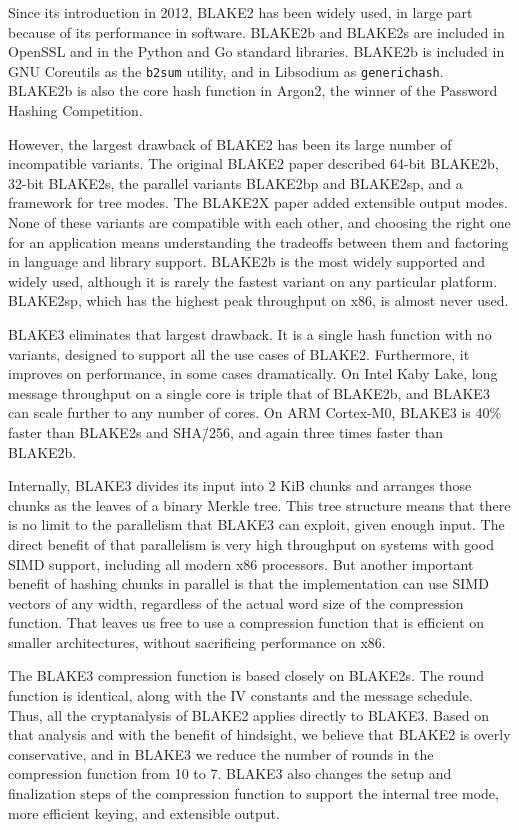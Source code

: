 \documentclass[11pt,notitlepage,a4paper]{article}
\begin{document}
Since its introduction in 2012, BLAKE2 has been widely used, in large part
because of its performance in software. BLAKE2b and BLAKE2s are included in
OpenSSL and in the Python and Go standard libraries. BLAKE2b is included in GNU
Coreutils as the \texttt{b2sum} utility, and in Libsodium as
\texttt{generichash}. BLAKE2b is also the core hash function in Argon2, the
winner of the Password Hashing Competition.

However, the largest drawback of BLAKE2 has been its large number of
incompatible variants. The original BLAKE2 paper described 64-bit BLAKE2b,
32-bit BLAKE2s, the parallel variants BLAKE2bp and BLAKE2sp, and a framework
for tree modes. The BLAKE2X paper added extensible output modes. None of these
variants are compatible with each other, and choosing the right one for an
application means understanding the tradeoffs between them and factoring in
language and library support. BLAKE2b is the most widely supported and widely
used, although it is rarely the fastest variant on any particular platform.
BLAKE2sp, which has the highest peak throughput on x86, is almost never used.

BLAKE3 eliminates that largest drawback. It is a single hash function with no
variants, designed to support all the use cases of BLAKE2. Furthermore, it
improves on performance, in some cases dramatically. On Intel Kaby Lake, long
message throughput on a single core is triple that of BLAKE2b, and BLAKE3 can
scale further to any number of cores. On ARM Cortex-M0, BLAKE3 is 40\% faster
than BLAKE2s and SHA\=/256, and again three times faster than BLAKE2b.

Internally, BLAKE3 divides its input into 2 KiB chunks and arranges those
chunks as the leaves of a binary Merkle tree. This tree structure means that
there is no limit to the parallelism that BLAKE3 can exploit, given enough
input. The direct benefit of that parallelism is very high throughput on
systems with good SIMD support, including all modern x86 processors. But
another important benefit of hashing chunks in parallel is that the
implementation can use SIMD vectors of any width, regardless of the actual word
size of the compression function. That leaves us free to use a compression
function that is efficient on smaller architectures, without sacrificing
performance on x86.

The BLAKE3 compression function is based closely on BLAKE2s. The round function
is identical, along with the IV constants and the message schedule. Thus, all
the cryptanalysis of BLAKE2 applies directly to BLAKE3. Based on that analysis
and with the benefit of hindsight, we believe that BLAKE2 is overly
conservative, and in BLAKE3 we reduce the number of rounds in the compression
function from 10 to 7. BLAKE3 also changes the setup and finalization steps of
the compression function to support the internal tree mode, more efficient
keying, and extensible output.
\end{document}
